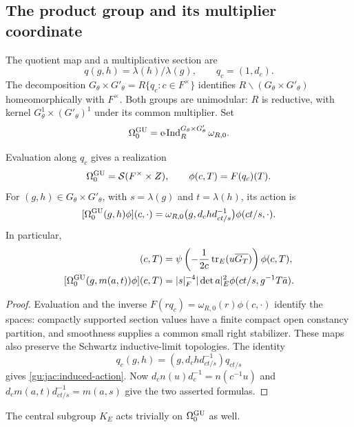 \subsection{The product group and its multiplier coordinate}
The quotient map and a multiplicative section are
\[
 q(g,h)=\lambda(h)/\lambda(g),\qquad q_c=(1,d_c).
\]
The decomposition $G_\theta\times G'_\theta=R\{q_c:c\in F^\times\}$ identifies
$R\backslash(G_\theta\times G'_\theta)$ homeomorphically with $F^\times$.
Both groups are unimodular: $R$ is reductive, with kernel
$G_\theta^1\times (G'_\theta)^1$ under its common multiplier. Set
\begin{equation}\label{gu:jac:full-product}
 \Omega_0^{\operatorname{GU}}=\operatorname{c\!-Ind}_R^{G_\theta\times G'_\theta}\omega_{R,0}.
\end{equation}
\begin{proposition}\label{gu:jac:full-model}
Evaluation along $q_c$ gives a realization
\[
 \Omega^{\operatorname{GU}}_0=\mathcal S(F^\times\times Z),
 \qquad \phi(c,T)=F(q_c)(T).
\]
For $(g,h)\in G_\theta\times G'_\theta$, with $s=\lambda(g)$ and $t=\lambda(h)$, its action is
\begin{equation}\label{gu:jac:induced-action}
 [\Omega^{\operatorname{GU}}_0(g,h)\phi](c,\cdot)
 =\omega_{R,0}\bigl(g,d_chd_{ct/s}^{-1}\bigr)
                   \phi(ct/s,\cdot).
\end{equation}
In particular,
\begin{align}
 [\Omega^{\GU}_0(1,n(u))\phi](c,T)
 &=\psi\left(-\frac1{2c}\operatorname{tr}_E
                            (u\overline{G_T})\right)\phi(c,T),
 \label{gu:jac:induced-n}\\
 [\Omega^{\GU}_0(g,m(a,t))\phi](c,T)
 &=|s|_F^{-4}|\det a|_E^2
                         \phi(ct/s,g^{-1}T\bar a).
 \label{gu:jac:induced-levi}
\end{align}
\end{proposition}

\begin{proof}
Evaluation and the inverse $F(rq_c)=\omega_{R,0}(r)\phi(c,\cdot)$
identify the spaces: compactly supported section values have a finite
compact open constancy partition, and smoothness supplies a common
small right stabilizer. These maps also preserve the Schwartz
inductive-limit topologies. The identity
\[
 q_c(g,h)=(g,d_chd_{ct/s}^{-1})q_{ct/s}
\]
gives \eqref{gu:jac:induced-action}. Now
$d_cn(u)d_c^{-1}=n(c^{-1}u)$ and
$d_cm(a,t)d_{ct/s}^{-1}=m(a,s)$ give the two asserted formulas.
\end{proof}
The central subgroup $K_E$ acts trivially on $\Omega_0^{\operatorname{GU}}$ as well.



